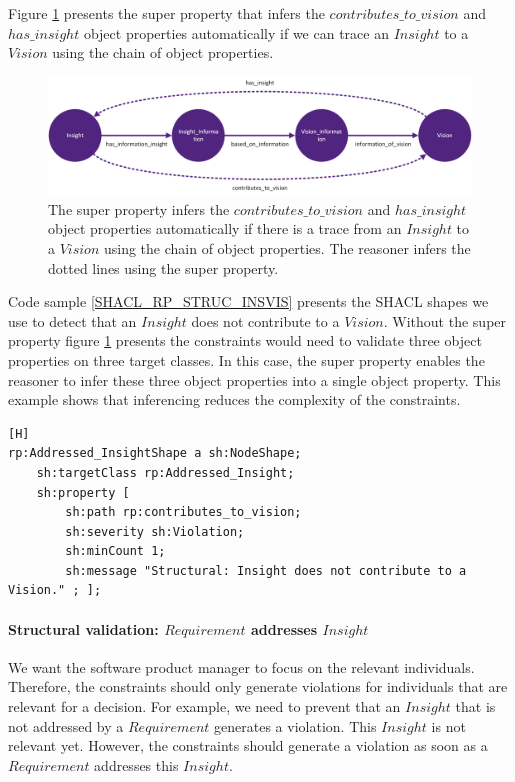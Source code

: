 Figure \ref{fig:05_RP_contributes_to_vision} presents the super property that infers the $contributes\_to\_vision$ and $has\_insight$ object properties automatically if we can trace an $Insight$ to a $Vision$ using the chain of object properties.

\begin{figure}[H]
\centering
  \includegraphics[width=17cm]{../../Images/05_Validation/05_RP_Contributes_To_Vision.png}
  \caption{The super property infers the $contributes\_to\_vision$ and $has\_insight$ object properties automatically if there is a trace from an $Insight$ to a $Vision$ using the chain of object properties. The reasoner infers the dotted lines using the super property.}
  \label{fig:05_RP_contributes_to_vision}
\end{figure}

Code sample \ref{SHACL_RP_STRUC_INSVIS} presents the SHACL shapes we use to detect that an $Insight$ does not contribute to a $Vision$. Without the super property figure \ref{fig:05_RP_contributes_to_vision} presents the constraints would need to validate three object properties on three target classes. In this case, the super property enables the reasoner to infer these three object properties into a single object property. This example shows that inferencing reduces the complexity of the constraints. 

\begin{lstlisting}[float,language=SHACL,caption={The SHACL shapes we use to detect that an $Addressed\_Insight$ does not contribute to a $Vision$.},label={SHACL_RP_STRUC_INSVIS}][H]
rp:Addressed_InsightShape a sh:NodeShape;
	sh:targetClass rp:Addressed_Insight; 
	sh:property [
		sh:path rp:contributes_to_vision;
		sh:severity sh:Violation;
		sh:minCount 1;
		sh:message "Structural: Insight does not contribute to a Vision." ; ];
\end{lstlisting}

\paragraph{Structural validation: $Requirement$ addresses $Insight$}
We want the software product manager to focus on the relevant individuals. Therefore, the constraints should only generate violations for individuals that are relevant for a decision. For example, we need to prevent that an $Insight$ that is not addressed by a $Requirement$ generates a violation. This $Insight$ is not relevant yet. However, the constraints should generate a violation as soon as a $Requirement$ addresses this $Insight$.

